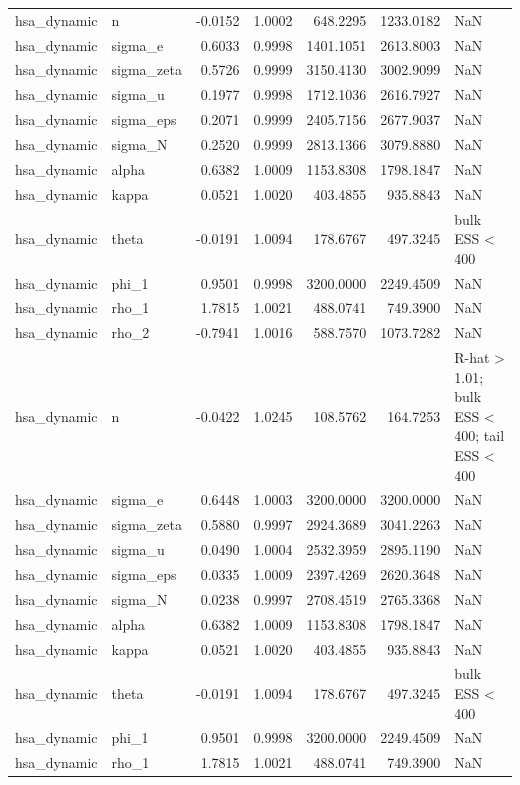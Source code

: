 \begin{tabular}{llrrrrl}
hsa\_dynamic & n & -0.0152 & 1.0002 & 648.2295 & 1233.0182 & NaN \\
hsa\_dynamic & sigma\_e & 0.6033 & 0.9998 & 1401.1051 & 2613.8003 & NaN \\
hsa\_dynamic & sigma\_zeta & 0.5726 & 0.9999 & 3150.4130 & 3002.9099 & NaN \\
hsa\_dynamic & sigma\_u & 0.1977 & 0.9998 & 1712.1036 & 2616.7927 & NaN \\
hsa\_dynamic & sigma\_eps & 0.2071 & 0.9999 & 2405.7156 & 2677.9037 & NaN \\
hsa\_dynamic & sigma\_N & 0.2520 & 0.9999 & 2813.1366 & 3079.8880 & NaN \\
hsa\_dynamic & alpha & 0.6382 & 1.0009 & 1153.8308 & 1798.1847 & NaN \\
hsa\_dynamic & kappa & 0.0521 & 1.0020 & 403.4855 & 935.8843 & NaN \\
hsa\_dynamic & theta & -0.0191 & 1.0094 & 178.6767 & 497.3245 & bulk ESS < 400 \\
hsa\_dynamic & phi\_1 & 0.9501 & 0.9998 & 3200.0000 & 2249.4509 & NaN \\
hsa\_dynamic & rho\_1 & 1.7815 & 1.0021 & 488.0741 & 749.3900 & NaN \\
hsa\_dynamic & rho\_2 & -0.7941 & 1.0016 & 588.7570 & 1073.7282 & NaN \\
hsa\_dynamic & n & -0.0422 & 1.0245 & 108.5762 & 164.7253 & R-hat > 1.01; bulk ESS < 400; tail ESS < 400 \\
hsa\_dynamic & sigma\_e & 0.6448 & 1.0003 & 3200.0000 & 3200.0000 & NaN \\
hsa\_dynamic & sigma\_zeta & 0.5880 & 0.9997 & 2924.3689 & 3041.2263 & NaN \\
hsa\_dynamic & sigma\_u & 0.0490 & 1.0004 & 2532.3959 & 2895.1190 & NaN \\
hsa\_dynamic & sigma\_eps & 0.0335 & 1.0009 & 2397.4269 & 2620.3648 & NaN \\
hsa\_dynamic & sigma\_N & 0.0238 & 0.9997 & 2708.4519 & 2765.3368 & NaN \\
hsa\_dynamic & alpha & 0.6382 & 1.0009 & 1153.8308 & 1798.1847 & NaN \\
hsa\_dynamic & kappa & 0.0521 & 1.0020 & 403.4855 & 935.8843 & NaN \\
hsa\_dynamic & theta & -0.0191 & 1.0094 & 178.6767 & 497.3245 & bulk ESS < 400 \\
hsa\_dynamic & phi\_1 & 0.9501 & 0.9998 & 3200.0000 & 2249.4509 & NaN \\
hsa\_dynamic & rho\_1 & 1.7815 & 1.0021 & 488.0741 & 749.3900 & NaN \\

\end{tabular}
